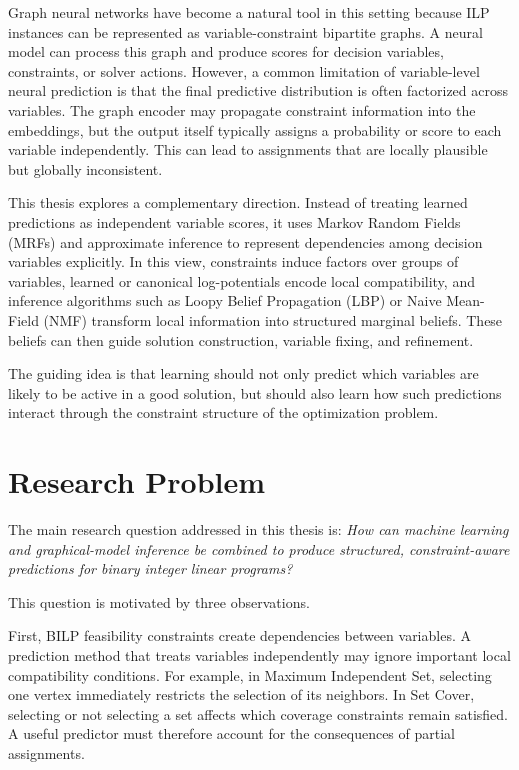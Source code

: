 Graph neural networks have become a natural tool in this setting because ILP instances can be represented as variable-constraint bipartite graphs. A neural model can process this graph and produce scores for decision variables, constraints, or solver actions. However, a common limitation of variable-level neural prediction is that the final predictive distribution is often factorized across variables. The graph encoder may propagate constraint information into the embeddings, but the output itself typically assigns a probability or score to each variable independently. This can lead to assignments that are locally plausible but globally inconsistent.

This thesis explores a complementary direction. Instead of treating learned predictions as independent variable scores, it uses Markov Random Fields (MRFs) and approximate inference to represent dependencies among decision variables explicitly. In this view, constraints induce factors over groups of variables, learned or canonical log-potentials encode local compatibility, and inference algorithms such as Loopy Belief Propagation (LBP) or Naive Mean-Field (NMF) transform local information into structured marginal beliefs. These beliefs can then guide solution construction, variable fixing, and refinement.

The guiding idea is that learning should not only predict which variables are likely to be active in a good solution, but should also learn how such predictions interact through the constraint structure of the optimization problem.

\section{Research Problem}

The main research question addressed in this thesis is: \emph{How can machine learning and graphical-model inference be combined to produce structured, constraint-aware predictions for binary integer linear programs?}

This question is motivated by three observations.

First, BILP feasibility constraints create dependencies between variables. A prediction method that treats variables independently may ignore important local compatibility conditions. For example, in Maximum Independent Set, selecting one vertex immediately restricts the selection of its neighbors. In Set Cover, selecting or not selecting a set affects which coverage constraints remain satisfied. A useful predictor must therefore account for the consequences of partial assignments.

